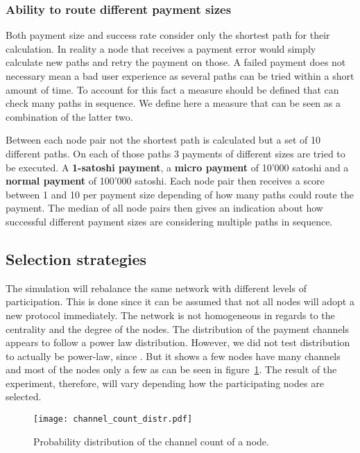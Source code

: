 \documentclass[final]{fhnwreport}       %
\begin{document}
\subsubsection{Ability to route different payment sizes}
Both payment size and success rate consider only the shortest path for their calculation. In reality a node that receives a payment error would simply calculate new paths and retry the payment on those. A failed payment does not necessary mean a bad user experience as several paths can be tried within a short amount of time. To account for this fact a measure should be defined that can check many paths in sequence. We define here a measure that can be seen as a combination of the latter two. 

Between each node pair not the shortest path is calculated but a set of 10 different paths. On each of those paths 3 payments of different sizes are tried to be executed. A \textbf{1-satoshi payment}, a \textbf{micro payment} of 10'000 satoshi and a \textbf{normal payment} of 100'000 satoshi. Each node pair then receives a score between 1 and 10 per payment size depending of how many paths could route the payment. The median of all node pairs then gives an indication about how successful different payment sizes are considering multiple paths in sequence. 

\subsection{Selection strategies}\label{subsec:selstrat}
The simulation will rebalance the same network with different levels of participation. This is done since it can be assumed that not all nodes will adopt a new protocol immediately. The network is not homogeneous in regards to the centrality and the degree of the nodes. The distribution of the payment channels appears to follow a power law distribution. However, we did not test distribution to actually be power-law, since . But it shows a few nodes have many channels and most of the nodes only a few as can be seen in figure~\ref{fig:channelcount}. The result of the experiment, therefore, will vary depending how the participating nodes are selected. 

\begin{figure}[H]
\centering
\texttt{[image: channel\_count\_distr.pdf]}
\caption{Probability distribution of the channel count of a node.}
\label{fig:channelcount}
\end{figure}
\end{document}
